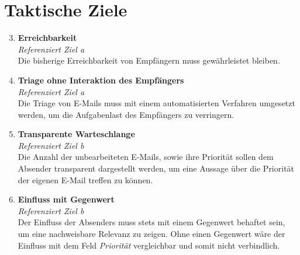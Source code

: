 \section{Taktische Ziele}
\begin{enumerate}[label=(\alph*)]
\setcounter{enumi}{2}
    \item \textbf{Erreichbarkeit}\\
    \textit{Referenziert Ziel a} \\
        Die bisherige Erreichbarkeit von Empfängern muss gewährleistet bleiben.
        
    \item \textbf{Triage ohne Interaktion des Empfängers}\\
    \textit{Referenziert Ziel a} \\
        Die Triage von E-Mails muss mit einem automatisierten Verfahren umgesetzt werden, um die Aufgabenlast des Empfängers zu verringern.
        
    \item \textbf{Transparente Warteschlange}\\
    \textit{Referenziert Ziel b} \\
        Die Anzahl der unbearbeiteten E-Mails, sowie ihre Priorität sollen dem Absender transparent dargestellt werden, um eine Aussage über die Priorität der eigenen E-Mail treffen zu können.
    
    \item \textbf{Einfluss mit Gegenwert}\\
    \textit{Referenziert Ziel b} \\
        Der Einfluss der Absenders muss stets mit einem Gegenwert behaftet sein, um eine nachweisbare Relevanz zu zeigen. Ohne einen Gegenwert wäre der Einfluss mit dem Feld \textit{Priorität} vergleichbar und somit nicht verbindlich.
\end{enumerate}


